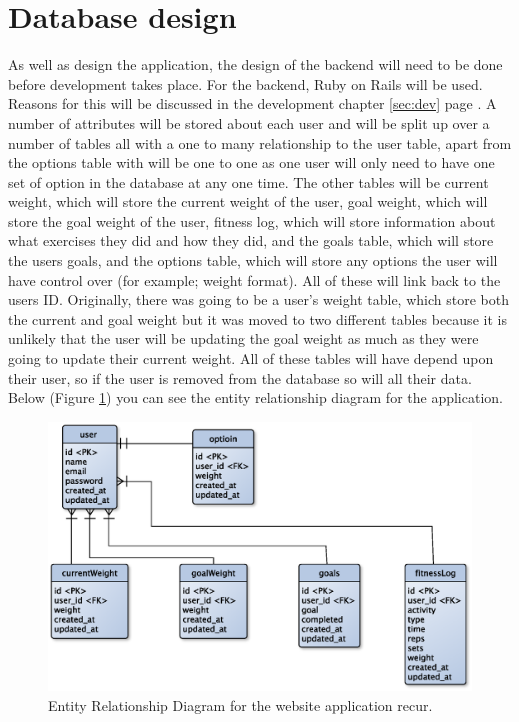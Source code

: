 \section{Database design}
As well as design the application, the design of the backend will need to be done before development takes place. For the backend, Ruby on Rails \citep{rails:2013} will be used. Reasons for this will be discussed in the development chapter \ref{sec:dev} page \pageref{sec:dev}. A number of attributes will be stored about each user and will be split up over a number of tables all with a one to many relationship to the user table, apart from the options table with will be one to one as one user will only need to have one set of option in the database at any one time. The other tables will be current weight, which will store the current weight of the user, goal weight, which will store the goal weight of the user, fitness log, which will store information about what exercises they did and how they did, and the goals table, which will store the users goals, and the options table, which will store any options the user will have control over (for example; weight format). All of these will link back to the users ID. Originally, there was going to be a user's weight table, which store both the current and goal weight but it was moved to two different tables because it is unlikely that the user will be updating the goal weight as much as they were going to update their current weight. All of these tables will have depend upon their user, so if the user is removed from the database so will all their data. Below (Figure \ref{fig:erd}) you can see the entity relationship diagram for the application.

\begin{figure}[!ht]
\centering
\includegraphics[scale=0.5]{chapters/figs/erd}
\caption{Entity Relationship Diagram for the website application recur.}
\label{fig:erd}
\end{figure}